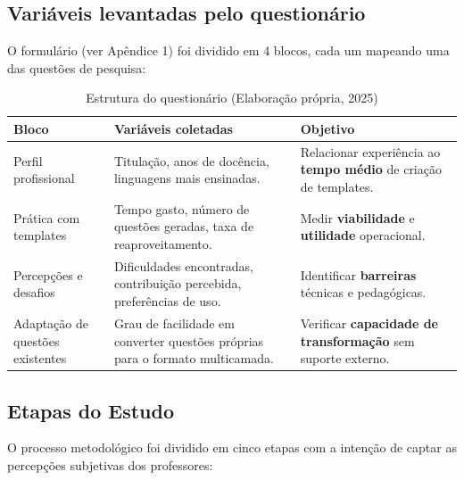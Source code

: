  
\subsection{Variáveis levantadas pelo questionário}
O formulário (ver Apêndice 1) foi dividido em 4 blocos, cada um mapeando uma das questões de pesquisa:

\begin{table}[H]
    \centering
    \begin{tabular}{|p{4cm}|p{5.4cm}|p{6cm}|}
        \hline
        \textbf{Bloco} & \textbf{Variáveis coletadas} & \textbf{Objetivo} \\ \hline
        Perfil profissional & Titulação, anos de docência, linguagens mais ensinadas. & Relacionar experiência ao \textbf{tempo médio} de criação de templates. \\ \hline
        Prática com templates & Tempo gasto, número de questões geradas, taxa de reaproveitamento. & Medir \textbf{viabilidade} e \textbf{utilidade} operacional. \\ \hline
        Percepções e desafios & Dificuldades encontradas, contribuição percebida, preferências de uso. & Identificar \textbf{barreiras} técnicas e pedagógicas. \\ \hline
        Adaptação de questões existentes & Grau de facilidade em converter questões próprias para o formato multicamada. & Verificar \textbf{capacidade de transformação} sem suporte externo. \\ \hline
    \end{tabular}
    \caption{Estrutura do questionário (Elaboração própria, 2025)}
    \label{tab:questionario-objetivos}
\end{table}

\subsection*{Etapas do Estudo}

O processo metodológico foi dividido em cinco etapas com a intenção de captar as percepções subjetivas dos professores:

